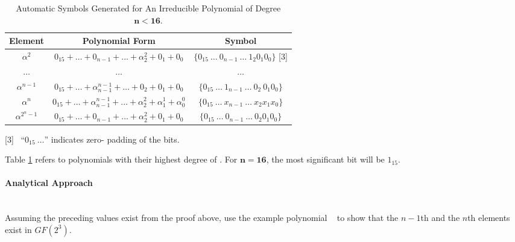    \begin{table}[h]
        \def\arraystretch{2.5}
        \caption{Automatic Symbols Generated for An Irreducible Polynomial of
        Degree $\bm{n < 16}$.}
        \centering
        \begin{tabular*}{400pt}{@{\extracolsep{\fill}} ccc}

        \textbf{Element} & \textbf{Polynomial Form} & \textbf{Symbol}
        \\
        \hline

        $\alpha^{2}$ & $0_{15} + \ldots + 0_{n-1} + \ldots +
        \alpha^{2}_{2} + 0_{1} + 0_{0}$ & $\{ 0_{15} \ \ldots \ 0_{n-1} \
        \ldots \ 1_{2} 0_{1} 0_{0} \}$ {\scriptsize [3]} \\

        $\ldots$ & $\ldots$ & $\ldots$ \\

        $\alpha^{n-1}$ & $0_{15} + \ldots + \alpha^{n-1}_{n-1} + \ldots
        + 0_{2} + 0_{1} + 0_{0}$ & $\{ 0_{15} \ \ldots \ 1_{n-1} \ \ldots \
          0_{2} \ 0_{1} 0_{0} \}$ \\

        $\alpha^{n}$ & $0_{15} + \ldots + \alpha^{n-1}_{n-1} + \ldots
        +\alpha^{2}_{2} + \alpha^{1}_{1} + \alpha^{0}_{0}$ & $\{ 0_{15} \ 
        \ldots \ x_{n-1} \ \ldots \ x_{2} x_{1} x_{0} \}$ \\

        $\alpha^{2^{n}-1}$ & $0_{15} + \ldots + 0_{n-1} + \ldots +
        \alpha^{2}_{2} + 0_{1} + 0_{0}$ & $\{ 0_{15} \ \ldots \ 0_{n-1} \ 
        \ldots \ 0_{2} 0_{1} 0_{0} \}$ \\

        \end{tabular*}
        \label{table:auto_sym}
    \end{table}

    {\scriptsize [3]} \ ``$0_{15} \ \ldots$'' indicates zero- padding of the
    bits.

    Table \ref{table:auto_sym} refers to polynomials with their highest degree
    of \bm{$n < 15$}. For $\bm{n = 16}$, the most significant bit will be
    $1_{15}$.

        \paragraph{Analytical Approach} \leavevmode \\ Assuming the preceding
        values exist from the proof above, use the example polynomial
        \examplepoly~ to show that the $n-1$th and the $n$th elements exist in
        $GF(2^{3})$.

